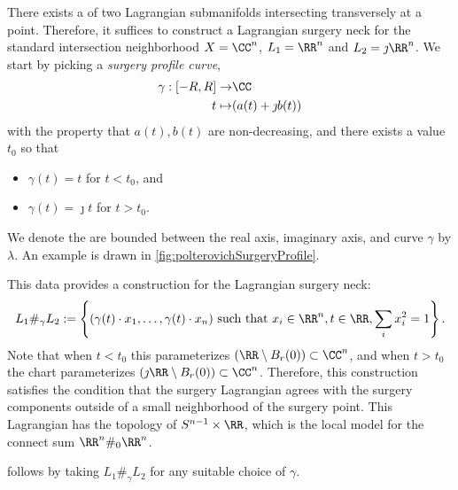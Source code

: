 
 
 

There exists a  of two Lagrangian submanifolds intersecting transversely at a point. Therefore, it suffices to construct a Lagrangian surgery neck for the standard intersection neighborhood $X=\CC^n$, $L_1=\RR^n$ and $L_2=\jmath\RR^n$.
We start by picking a \emph{surgery profile curve},  
\begin{align*}
      \gamma: [-R, R] \to& \CC\\
      t\mapsto& (a(t)+\jmath b(t))
\end{align*}
with the property that $a(t), b(t)$ are non-decreasing, and there exists a value $t_0$ so that 
\begin{itemize}
      \item  $\gamma(t)=t$ for $t< t_0$, and
      \item  $\gamma(t)=\jmath t$ for $t>t_0$.
\end{itemize}
We denote the are bounded between the real axis, imaginary axis, and curve $\gamma$ by $\lambda$.
An example is drawn in \cref{fig:polterovichSurgeryProfile}.

This data provides a construction for the Lagrangian surgery neck:
\[
	L_1\#_\gamma L_2:=\left\{(\gamma(t)\cdot x_1,\ldots,  \gamma(t)\cdot x_n) \text{ such that } x_i \in \RR^n,t\in \RR, \sum_{i} x_i^2=1\right\}.
\]
Note that when $t < t_0$ this parameterizes $(\RR\setminus B_r(0))\subset \CC^n$, and when $t > t_0$ the chart parameterizes $(\jmath \RR \setminus B_r(0))\subset \CC^n$. 
Therefore, this construction satisfies the condition that the surgery Lagrangian agrees with the surgery components outside of a small neighborhood of the surgery point.
This Lagrangian has the topology of $S^{n-1}\times \RR$, which is the local model for the connect sum $\RR^n\#_0\RR^n$.


 follows by taking $L_1\#_\gamma L_2$ for any suitable choice of $\gamma$.
 
